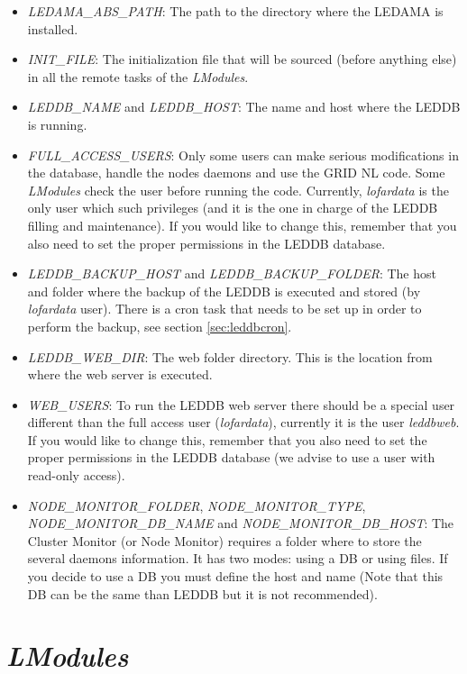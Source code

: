 \documentclass[a4paper,11pt]{article}
\begin{document}
\begin{itemize}
    \item \textit{LEDAMA\_ABS\_PATH}: The path to the directory where the LEDAMA is installed. 
    \item \textit{INIT\_FILE}: The initialization file that will be sourced (before anything else) in all the remote tasks of the \textit{LModules}.
    \item \textit{LEDDB\_NAME} and \textit{LEDDB\_HOST}: The name and host where the LEDDB is running.
    \item \textit{FULL\_ACCESS\_USERS}: Only some users can make serious modifications in the database, handle the nodes daemons and use the GRID NL code. Some \textit{LModules} check the user before running the code. Currently, \textit{lofardata} is the only user which such privileges (and it is the one in charge of the LEDDB filling and maintenance). If you would like to change this, remember that you also need to set the proper permissions in the LEDDB database.
    \item \textit{LEDDB\_BACKUP\_HOST} and \textit{LEDDB\_BACKUP\_FOLDER}: The host and folder where the backup of the LEDDB is executed and stored (by \textit{lofardata} user). There is a cron task that needs to be set up in order to perform the backup, see section \ref{sec:leddbcron}.
    \item \textit{LEDDB\_WEB\_DIR}: The web folder directory. This is the location from where the web server is executed.
    \item \textit{WEB\_USERS}: To run the LEDDB web server there should be a special user different than the full access user (\textit{lofardata}), currently it is the user \textit{leddbweb}. If you would like to change this, remember that you also need to set the proper permissions in the LEDDB database (we advise to use a user with read-only access).
    \item \textit{NODE\_MONITOR\_FOLDER}, \textit{NODE\_MONITOR\_TYPE}, \textit{NODE\_MONITOR\_DB\_NAME} and \textit{NODE\_MONITOR\_DB\_HOST}: The Cluster Monitor (or Node Monitor) requires a folder where to store the several daemons information. It has two modes: using a DB or using files. If you decide to use a DB you must define the host and name (Note that this DB can be the same than LEDDB but it is not recommended).
\end{itemize}

\section{\textit{LModules}}
\label{sec:lmodules}
\end{document}
